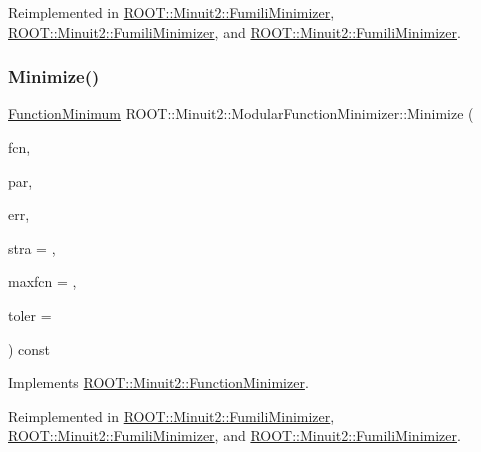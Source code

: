 Reimplemented in \mbox{\hyperlink{classROOT_1_1Minuit2_1_1FumiliMinimizer_ab9ec6dd4a0e664db7d23a3ea3b0a3c75}{R\+O\+O\+T\+::\+Minuit2\+::\+Fumili\+Minimizer}}, \mbox{\hyperlink{classROOT_1_1Minuit2_1_1FumiliMinimizer_ab9ec6dd4a0e664db7d23a3ea3b0a3c75}{R\+O\+O\+T\+::\+Minuit2\+::\+Fumili\+Minimizer}}, and \mbox{\hyperlink{classROOT_1_1Minuit2_1_1FumiliMinimizer_ab9ec6dd4a0e664db7d23a3ea3b0a3c75}{R\+O\+O\+T\+::\+Minuit2\+::\+Fumili\+Minimizer}}.

\mbox{\label{classROOT_1_1Minuit2_1_1ModularFunctionMinimizer_a8a71d388729f9e81c3c031a2962f4d99}} 
\subsubsection{\texorpdfstring{Minimize()}{Minimize()}\hspace{0.1cm}{\footnotesize\ttfamily [4/33]}}
{\footnotesize\ttfamily \mbox{\hyperlink{classROOT_1_1Minuit2_1_1FunctionMinimum}{Function\+Minimum}} R\+O\+O\+T\+::\+Minuit2\+::\+Modular\+Function\+Minimizer\+::\+Minimize (\begin{DoxyParamCaption}\item[{const \mbox{\hyperlink{classROOT_1_1Minuit2_1_1FCNGradientBase}{F\+C\+N\+Gradient\+Base}} \&}]{fcn,  }\item[{const std\+::vector$<$ double $>$ \&}]{par,  }\item[{const std\+::vector$<$ double $>$ \&}]{err,  }\item[{unsigned int}]{stra = {},  }\item[{unsigned int}]{maxfcn = {},  }\item[{double}]{toler = {} }\end{DoxyParamCaption}) const\hspace{0.3cm}{\ttfamily [virtual]}}



Implements \mbox{\hyperlink{classROOT_1_1Minuit2_1_1FunctionMinimizer_ac6063af1cb58f0fd75b16d3cebc49f54}{R\+O\+O\+T\+::\+Minuit2\+::\+Function\+Minimizer}}.



Reimplemented in \mbox{\hyperlink{classROOT_1_1Minuit2_1_1FumiliMinimizer_a2bb7832765e33c24ffad4636ad3b7193}{R\+O\+O\+T\+::\+Minuit2\+::\+Fumili\+Minimizer}}, \mbox{\hyperlink{classROOT_1_1Minuit2_1_1FumiliMinimizer_a2bb7832765e33c24ffad4636ad3b7193}{R\+O\+O\+T\+::\+Minuit2\+::\+Fumili\+Minimizer}}, and \mbox{\hyperlink{classROOT_1_1Minuit2_1_1FumiliMinimizer_a2bb7832765e33c24ffad4636ad3b7193}{R\+O\+O\+T\+::\+Minuit2\+::\+Fumili\+Minimizer}}.

